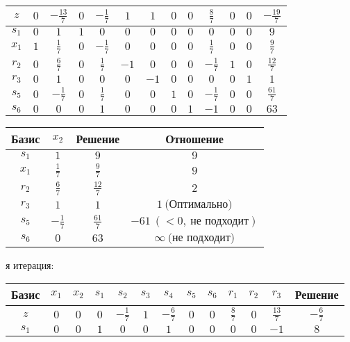 \documentclass{article}%
\begin{document}
\begin{flushleft}
\begin{tabular}{|c|ccccccccccc|c|}
\hline%
$z$&$0$&$-\frac{13}{7}$&$0$&$-\frac{1}{7}$&$1$&$1$&$0$&$0$&$\frac{8}{7}$&$0$&$0$&$-\frac{19}{7}$\\%
\hline%
$s_{1}$&$0$&$1$&$1$&$0$&$0$&$0$&$0$&$0$&$0$&$0$&$0$&$9$\\%
$x_{1}$&$1$&$\frac{1}{7}$&$0$&$-\frac{1}{7}$&$0$&$0$&$0$&$0$&$\frac{1}{7}$&$0$&$0$&$\frac{9}{7}$\\%
$r_{2}$&$0$&$\frac{6}{7}$&$0$&$\frac{1}{7}$&$-1$&$0$&$0$&$0$&$-\frac{1}{7}$&$1$&$0$&$\frac{12}{7}$\\%
$r_{3}$&$0$&$1$&$0$&$0$&$0$&$-1$&$0$&$0$&$0$&$0$&$1$&$1$\\%
$s_{5}$&$0$&$-\frac{1}{7}$&$0$&$\frac{1}{7}$&$0$&$0$&$1$&$0$&$-\frac{1}{7}$&$0$&$0$&$\frac{61}{7}$\\%
$s_{6}$&$0$&$0$&$0$&$1$&$0$&$0$&$0$&$1$&$-1$&$0$&$0$&$63$\\%
\hline%
\end{tabular}%
\newline%
\newline%
\newline%
\begin{tabular}{|cccc|}%
\hline%
Базис&$x_{2}$&Решение&Отношение\\%
\hline%
$s_{1}$&$1$&$9$&$9$\\%
$x_{1}$&$\frac{1}{7}$&$\frac{9}{7}$&$9$\\%
$r_{2}$&$\frac{6}{7}$&$\frac{12}{7}$&$2$\\%
$r_{3}$&$1$&$1$&$1\: \text{(Оптимально)}$\\%
$s_{5}$&$-\frac{1}{7}$&$\frac{61}{7}$&$-61\: (< 0, \: \text{не подходит})$\\%
$s_{6}$&$0$&$63$&$\infty \: \text{(не подходит)}$\\%
\hline%
\end{tabular}%
\newline%
\newline%
я итерация: %
\newline%
\newline%
\renewcommand{\arraystretch}{1.3}%
\begin{tabular}{|c|ccccccccccc|c|}%
\hline%
Базис&$x_{1}$&$x_{2}$&$s_{1}$&$s_{2}$&$s_{3}$&$s_{4}$&$s_{5}$&$s_{6}$&$r_{1}$&$r_{2}$&$r_{3}$&Решение\\%
\hline%
$z$&$0$&$0$&$0$&$-\frac{1}{7}$&$1$&$-\frac{6}{7}$&$0$&$0$&$\frac{8}{7}$&$0$&$\frac{13}{7}$&$-\frac{6}{7}$\\%
\hline%
$s_{1}$&$0$&$0$&$1$&$0$&$0$&$1$&$0$&$0$&$0$&$0$&$-1$&$8$\\%

\end{tabular}
\end{flushleft}
\end{document}
